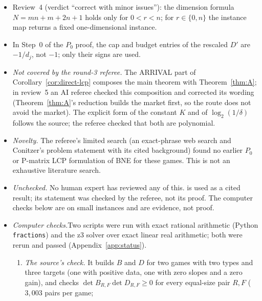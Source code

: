 \begin{itemize}[nosep]
        coefficient of $\tau$, $C$ is defined after clearing each row separately, and the vertex
        argument uses at most $N+1$ independent tight rows (Lemma~\ref{app-dl:lem:gap}). (F4) The decoder
        states that the points $\theta,\dots,\theta+r-1$ are tested in $[0,r)$, that endpoints have
        measure zero and follow the half-open convention, and identifies each pure action as an
        $r$-subset before grouping (Lemma~\ref{app-dl:lem:decode}).
  \item Review~4 (verdict ``correct with minor issues''): the dimension formula $N=mn+m+2n+1$ holds only for $0<r<n$; for $r\in\{0,n\}$ the instance map returns a fixed one-dimensional instance.
\item In Step~0 of the $P_0$ proof, the cap and budget entries of the rescaled $D'$ are $-1/d_j$, not $-1$; only their signs are used.
  \item \emph{Not covered by the round-3 referee.} The ARRIVAL part of Corollary~\ref{cor:direct-lcp} composes the main theorem with Theorem~\ref{thm:A}; in review~5 an AI referee checked this composition and corrected its wording (Theorem~\ref{thm:A}'s reduction builds the market first, so the route does not avoid the market). The explicit form of the constant $K$ and of $\log_2(1/\delta)$ follows the
        source; the referee checked that both are polynomial.
  \item \emph{Novelty.} The referee's limited search (an exact-phrase web search and Conitzer's problem
        statement with its cited background) found no earlier $P_0$ or P-matrix LCP formulation of BNE
        for these games. This is not an exhaustive literature search.
  \item \emph{Unchecked.} No human expert has reviewed any of this. \cite[Thm.~81]{fgms18} is used as a
        cited result; its statement was checked by the referee, not its proof. The computer checks below
        are on small instances and are evidence, not proof.
  \item \emph{Computer checks.}Two scripts were run with exact rational arithmetic (Python
  \texttt{fractions}) and the z3 solver over exact linear real arithmetic; both were rerun and passed
  (Appendix~\ref{app:status}).
  \begin{enumerate}[nosep]
    \item \emph{The source's check.} It builds $B$ and $D$ for two games with two types and three targets
          (one with positive data, one with zero slopes and a zero gain), and checks
          $\det B_{R,F}\det D_{R,F}\ge0$ for every equal-size pair $R,F$ ($3{,}003$ pairs per game;

\end{enumerate}
\end{itemize}
